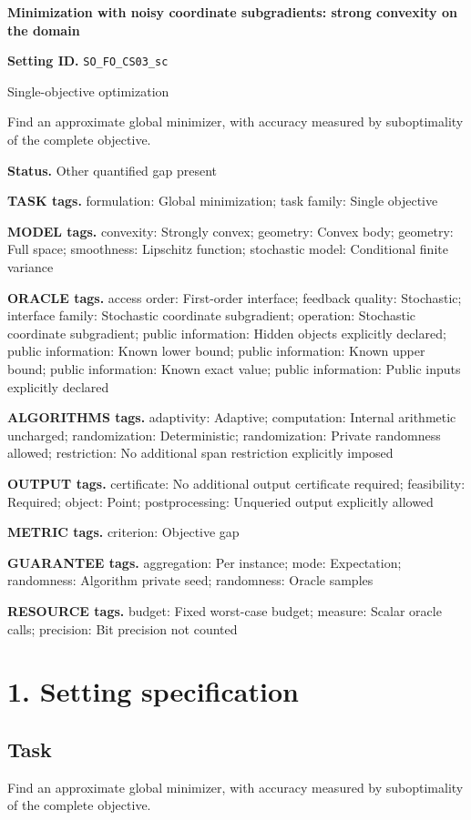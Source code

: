 \documentclass[10pt,a4paper]{article}
\begin{document}
\raggedright

{\LARGE\bfseries\sffamily\color{AtlasNavy} Minimization with noisy coordinate subgradients: strong convexity on the domain\par}\vspace{5pt}
\textbf{Setting ID.} \texttt{SO\_\allowbreak{}FO\_\allowbreak{}CS03\_\allowbreak{}sc}

Single-objective optimization

Find an approximate global minimizer, with accuracy measured by suboptimality of the complete objective.

\textbf{Status.} Other quantified gap present

\textbf{TASK tags.} formulation: Global minimization; task family: Single objective

\textbf{MODEL tags.} convexity: Strongly convex; geometry: Convex body; geometry: Full space; smoothness: Lipschitz function; stochastic model: Conditional finite variance

\textbf{ORACLE tags.} access order: First-order interface; feedback quality: Stochastic; interface family: Stochastic coordinate subgradient; operation: Stochastic coordinate subgradient; public information: Hidden objects explicitly declared; public information: Known lower bound; public information: Known upper bound; public information: Known exact value; public information: Public inputs explicitly declared

\textbf{ALGORITHMS tags.} adaptivity: Adaptive; computation: Internal arithmetic uncharged; randomization: Deterministic; randomization: Private randomness allowed; restriction: No additional span restriction explicitly imposed

\textbf{OUTPUT tags.} certificate: No additional output certificate required; feasibility: Required; object: Point; postprocessing: Unqueried output explicitly allowed

\textbf{METRIC tags.} criterion: Objective gap

\textbf{GUARANTEE tags.} aggregation: Per instance; mode: Expectation; randomness: Algorithm private seed; randomness: Oracle samples

\textbf{RESOURCE tags.} budget: Fixed worst-case budget; measure: Scalar oracle calls; precision: Bit precision not counted

\section{1. Setting specification}
\subsection{Task}
Find an approximate global minimizer, with accuracy measured by suboptimality of the complete objective.
\end{document}

